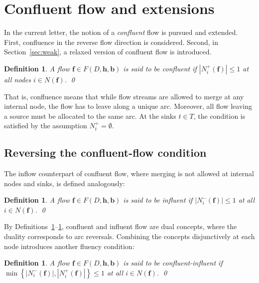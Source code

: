 \documentclass[pdflatex,sn-mathphys-num]{sn-jnl}%
\theoremstyle{thmstyleone}%
\newtheorem{definition}[theorem]{Definition}%
\begin{document}
\section{Confluent flow and extensions} \label{sec:conf}
In the current letter, the notion of a \emph{confluent} flow \cite{chen2006merge} is pursued and extended.
First, confluence in the reverse flow direction is considered. Second, in Section~\ref{sec:weak}, a relaxed version of confluent flow is introduced.
\begin{definition} \label{def:conf}
A flow $\boldsymbol{f}\in F(D,\boldsymbol{h},\boldsymbol{b})$ is said to be \emph{confluent} if $|N_i^+(\boldsymbol{f})|\leq 1$ at all nodes $i\in N(\boldsymbol{f})$.
\qed
\end{definition}

That is, confluence means that while flow streams are allowed to merge at any internal node, the flow has to leave along a unique arc.
Moreover, all flow leaving a source must be allocated to the same arc. At the sinks $t\in T$, the condition is satisfied by the assumption $N_t^+=\emptyset$.

\subsection{Reversing the confluent-flow condition} \label{sec:inf}
The inflow counterpart of confluent flow, where merging is not allowed at internal nodes and sinks, is defined analogously:
\begin{definition} \label{def:inf}
A flow $\boldsymbol{f}\in F(D,\boldsymbol{h},\boldsymbol{b})$ is said to be \emph{influent} if $|N_i^-(\boldsymbol{f})|\leq 1$ at all $i\in N(\boldsymbol{f})$.
\qed
\end{definition}

By Definitions~\ref{def:conf}--\ref{def:inf}, confluent and influent flow are dual concepts, where the duality corresponds to arc reversals.
Combining the concepts disjunctively at each node introduces another fluency condition:
\begin{definition} \label{def:confinf}
A flow $\boldsymbol{f}\in F(D,\boldsymbol{h},\boldsymbol{b})$ is said to be \emph{confluent-influent} if
$\displaystyle{\min\left\{\left|N_i^-(\boldsymbol{f})\right|,\left|N_i^+(\boldsymbol{f})\right|\right\}\leq 1}$ at all $i\in N(\boldsymbol{f})$.
\qed
\end{definition}
\end{document}
